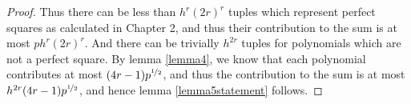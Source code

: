 \documentclass{report}
\begin{document}
\begin{proof}
Thus there can be less than $h^r(2r)^r$ tuples which represent perfect squares as calculated in Chapter 2, and thus their contribution to the sum is at most $ph^r(2r)^r$. And there can be trivially $h^{2r}$ tuples for polynomials which are not a perfect square. By lemma \ref{lemma4}, we know that each polynomial contributes at most $(4r-1)p^{\nicefrac{1}{2}}$, and thus the contribution to the sum is at most $h^{2r}(4r-1)p^{\nicefrac{1}{2}}$, and hence lemma \ref{lemma5statement} follows.
%
\begin{comment}
A factor will occur in an even power when each multiplicative term in the expanded representation (each term has a power of exactly 1) $(x+a+m_1)(x+b+m_1) (x+a+m_2)(x+b+m_2) ...(x+a+m_{2r}) (x+b+m_{2r})$ can be paired with another term, such that both terms evaluate to the same linear polynomial when substituted with the $m$ additive term in them. Say a generic pair of terms is $(x+c_i+m_i)$ and $(x+c_j+m_j)$, where $c_i$ and $c_j$ each stand for whichever of $a$ or $b$ occurs in the respective paired term. The pair can occur in two ways:
\begin{itemize}
    \item $c_i=c_j$ and thus $m_i=m_j$, i.e. $(x+a+m_i)=(x+a+m_j)$ or $(x+b+m_i)=(x+b+m_j)$
    \item $c_i\neq c_j$, and thus $(x+a+m_i)=(x+b+m_j)$ or $(x+b+m_i)=(x+a+m_j)$
\end{itemize}
\end{comment}
\end{proof}
%
%
\end{document}
